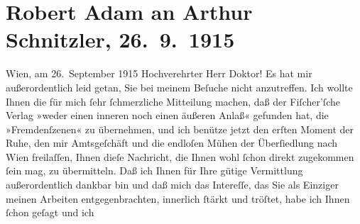 

         
         \newcommand{\erwaehntePersonen}{Personen: }
         \newcommand{\erwaehnteInstitutionen}{Institutionen: Bezirksgericht Wien Floridsdorf, S. Fischer Verlag}
         \newcommand{\erwaehnteOrte}{Orte: Meidlinger Hauptstraße, Wien, XII., Meidling, XXI., Floridsdorf, Zistersdorf}
         \newcommand{\erwaehnteWerke}{Werke: Der Fremde}
               \section[Robert Adam an Arthur Schnitzler, 26. 9. 1915]{ Robert Adam an Arthur Schnitzler, 26. 9. 1915}\nopagebreak{}\rehead{ }\begin{ledgroupsized}[t]{13cm}\normalsize\beginnumbering \toendnotes[C]{\smallbreak\pagebreak[2]} 
\pstart
           \raggedleft{}{\pb}Wien, am 26. September 1915\pend
           \pstart{}Hochverehrter Herr Doktor!\pend\pstart
           Es hat mir außerordentlich leid getan, Sie bei meinem Beſuche nicht anzutreffen. Ich
               wollte Ihnen die für mich ſehr ſchmerzliche Mitteilung machen, daß der Fiſcher’ſche Verlag »weder einen inneren noch einen
               äußeren Anlaß« gefunden hat, die »Fremdenſzenen« zu
               übernehmen, und ich benütze jetzt den erſten Moment der Ruhe, den mir Amtsgeſchäft
               und die endloſen Mühen der Überſiedlung nach Wien
               freilaſſen, Ihnen dieſe Nachricht, die Ihnen wohl ſchon direkt zugekommen ſein mag,
               zu übermitteln.\pend
           \pstart
           Daß ich Ihnen für Ihre gütige Vermittlung außerordentlich dankbar bin und daß mich
               das {\pb}Intereſſe, das Sie als Einziger meinen Arbeiten
               entgegenbrachten, innerlich ſtärkt und tröſtet, habe ich Ihnen ſchon geſagt und ich

\end{ledgroupsized}
